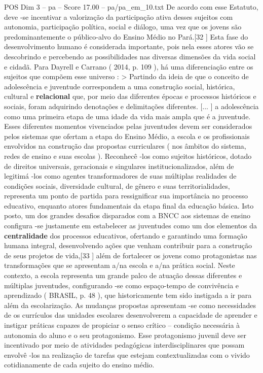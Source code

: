 \begin{textsample}{POS Dim 3 – pa – Score 17.00 – pa/pa\_em\_10.txt}
De acordo com esse Estatuto, deve -se incentivar a valorização da participação ativa desses sujeitos com autonomia, participação política, social e diálogo, uma vez que os jovens são predominantemente o público-alvo do Ensino Médio no Pará.[32 ] Esta fase do desenvolvimento humano é considerada importante, pois nela esses atores vão se descobrindo e percebendo as possibilidades nas diversas dimensões da vida social e cidadã.
Para Dayrell e Carrano ( 2014, p. 109 ), há uma diferenciação entre os sujeitos que compõem esse universo : > Partindo da ideia de que o conceito de adolescência e juventude correspondem a uma construção social, histórica, cultural e \textbf{relacional} que, por meio das diferentes épocas e processos históricos e sociais, foram adquirindo denotações e delimitações diferentes. [... ] a adolescência como uma primeira etapa de uma idade da vida mais ampla que é a juventude.
Esses diferentes momentos vivenciados pelas juventudes devem ser considerados pelos sistemas que ofertam a etapa do Ensino Médio, a escola e os profissionais envolvidos na construção das propostas curriculares ( nos âmbitos do sistema, redes de ensino e suas escolas ).
Reconhecê -los como sujeitos históricos, dotado de direitos universais, geracionais e singulares institucionalizados, além de legitimá -los como agentes transformadores de suas múltiplas realidades de condições sociais, diversidade cultural, de gênero e suas territorialidades, representa um ponto de partida para ressignificar sua importância no processo educativo, enquanto atores fundamentais da etapa final da educação básica.
Isto posto, um dos grandes desafios disparados com a BNCC aos sistemas de ensino configura -se justamente em estabelecer as juventudes como um dos elementos da \textbf{centralidade} dos processos educativos, ofertando e garantindo uma formação humana integral, desenvolvendo ações que venham contribuir para a construção de seus projetos de vida,[33 ] além de fortalecer os jovens como protagonistas nas transformações que se apresentam a/na escola e a/na prática social.
Neste contexto, a escola representa um grande palco de atuação dessas diferentes e múltiplas juventudes, configurando -se como espaço-tempo de convivência e aprendizado ( BRASIL, p. 48 ), que historicamente tem sido instigada a ir para além da escolarização.
As mudanças propostas apresentam -se como necessidades de os currículos das unidades escolares desenvolverem a capacidade de aprender e instigar práticas capazes de propiciar o senso crítico – condição necessária à autonomia do aluno e o seu protagonismo.
Esse protagonismo juvenil deve ser incentivado por meio de atividades pedagógicas interdisciplinares que possam envolvê -los na realização de tarefas que estejam contextualizadas com o vivido cotidianamente de cada sujeito do ensino médio.

\end{textsample}
